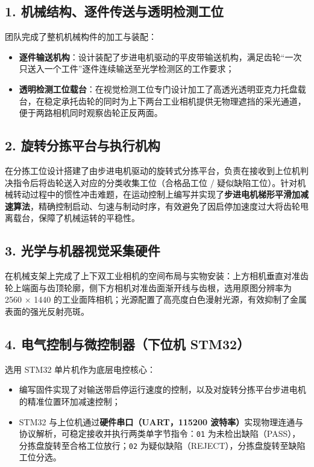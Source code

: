 \subsection*{1. 机械结构、逐件传送与透明检测工位}
团队完成了整机机械构件的加工与装配：
\begin{itemize}
    \item \textbf{逐件输送机构}：设计装配了步进电机驱动的平皮带输送机构，满足齿轮“一次只送入一个工件”逐件连续输送至光学检测区的工作要求；
    \item \textbf{透明检测工位载台}：在视觉检测工位专门设计加工了高透光透明亚克力托盘载台，在稳定承托齿轮的同时为上下两台工业相机提供无物理遮挡的采光通道，便于两路相机同时观察齿轮正反两面。
\end{itemize}

\subsection*{2. 旋转分拣平台与执行机构}
在分拣工位设计搭建了由步进电机驱动的旋转式分拣平台，负责在接收到上位机判决指令后将齿轮送入对应的分类收集工位（合格品工位 / 疑似缺陷工位）。针对机械转动过程中的惯性冲击难题，在运动控制上编写并实现了\textbf{步进电机梯形平滑加减速算法}，精确控制启动、匀速与制动时序，有效避免了因启停加速度过大将齿轮甩离载台，保障了机械运转的平稳性。

\subsection*{3. 光学与机器视觉采集硬件}
在机械支架上完成了上下双工业相机的空间布局与实物安装：上方相机垂直对准齿轮上端面与齿顶轮廓，侧下方相机对准齿面渐开线与齿根，选用原图分辨率为 2560 $\times$ 1440 的工业面阵相机；光源配置了高亮度白色漫射光源，有效抑制了金属表面的强光反射亮斑。

\subsection*{4. 电气控制与微控制器（下位机 STM32）}
选用 STM32 单片机作为底层电控核心：
\begin{itemize}
    \item 编写固件实现了对输送带启停运行速度的控制，以及对旋转分拣平台步进电机的精准位置环加减速控制；
    \item STM32 与上位机通过\textbf{硬件串口（UART，115200 波特率）}实现物理连通与协议解析，可稳定接收并执行两类单字节指令：\texttt{01} 为未检出缺陷（PASS），分拣盘旋转至合格工位放行；\texttt{02} 为疑似缺陷（REJECT），分拣盘旋转至缺陷工位分选。
\end{itemize}


